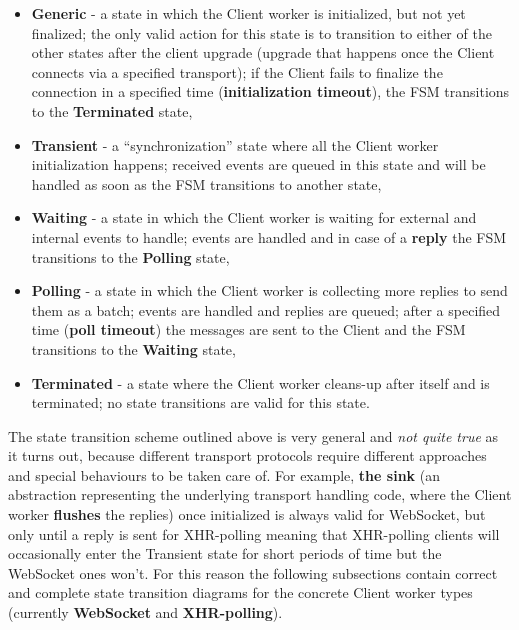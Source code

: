 \documentclass[a4paper]{article}
\begin{document}
\begin{itemize}
\item \textbf{Generic} - a state in which the Client worker is initialized, but not yet finalized; the only valid action for this state is to transition to either of the other states after the client upgrade (upgrade that happens once the Client connects via a specified transport); if the Client fails to finalize the connection in a specified time (\textbf{initialization timeout}), the FSM transitions to the \textbf{Terminated} state,
\item \textbf{Transient} - a ``synchronization'' state where all the Client worker initialization happens; received events are queued in this state and will be handled as soon as the FSM transitions to another state,
\item \textbf{Waiting} - a state in which the Client worker is waiting for external and internal events to handle; events are handled and in case of a \textbf{reply} the FSM transitions to the \textbf{Polling} state,
\item \textbf{Polling} - a state in which the Client worker is collecting more replies to send them as a batch; events are handled and replies are queued; after a specified time (\textbf{poll timeout}) the messages are sent to the Client and the FSM transitions to the \textbf{Waiting} state,
\item \textbf{Terminated} - a state where the Client worker cleans-up after itself and is terminated; no state transitions are valid for this state.
\end{itemize}

\noindent
The state transition scheme outlined above is very general and \emph{not quite true} as it turns out, because different transport protocols require different approaches and special behaviours to be taken care of. For example, \textbf{the sink} (an abstraction representing the underlying transport handling code, where the Client worker \textbf{flushes} the replies) once initialized is always valid for WebSocket, but only until a reply is sent for XHR-polling meaning that XHR-polling clients will occasionally enter the Transient state for short periods of time but the WebSocket ones won't. For this reason the following subsections contain correct and complete state transition diagrams for the concrete Client worker types (currently \textbf{WebSocket} and \textbf{XHR-polling}).
\end{document}
